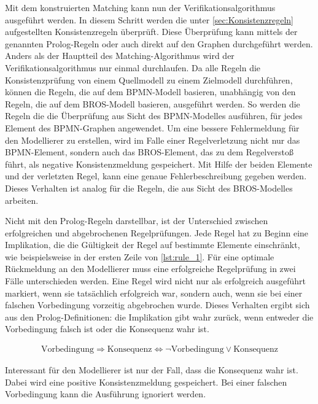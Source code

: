 Mit dem konstruierten Matching kann nun der Verifikationsalgorithmus ausgeführt werden.
In diesem Schritt werden die unter \cref{sec:Konsistenzregeln} aufgestellten Konsistenzregeln überprüft.
Diese Überprüfung kann mittels der genannten Prolog-Regeln oder auch direkt auf den Graphen durchgeführt werden.
Anders als der Hauptteil des Matching-Algorithmus wird der Verifikationsalgorithmus nur einmal durchlaufen.
Da alle Regeln die Konsistenzprüfung von einem Quellmodell zu einem Zielmodell durchführen, können die Regeln, die auf dem BPMN-Modell basieren, unabhängig von den Regeln, die auf dem BROS-Modell basieren, ausgeführt werden.
So werden die Regeln die die Überprüfung aus Sicht des BPMN-Modelles ausführen, für jedes Element des BPMN-Graphen angewendet.
Um eine bessere Fehlermeldung für den Modellierer zu erstellen, wird im Falle einer Regelverletzung nicht nur das BPMN-Element, sondern auch das BROS-Element, das zu dem Regelverstoß führt, als negative Konsistenzmeldung gespeichert.
Mit Hilfe der beiden Elemente und der verletzten Regel, kann eine genaue Fehlerbeschreibung gegeben werden.
Dieses Verhalten ist analog für die Regeln, die aus Sicht des BROS-Modelles arbeiten.

Nicht mit den Prolog-Regeln darstellbar, ist der Unterschied zwischen erfolgreichen und abgebrochenen Regelprüfungen.
Jede Regel hat zu Beginn eine Implikation, die die Gültigkeit der Regel auf bestimmte Elemente einschränkt, wie beispielsweise in der ersten Zeile von \cref{lst:rule_1}.
Für eine optimale Rückmeldung an den Modellierer muss eine erfolgreiche Regelprüfung in zwei Fälle unterschieden werden.
Eine Regel wird nicht nur als erfolgreich ausgeführt markiert, wenn sie tatsächlich erfolgreich war, sondern auch, wenn sie bei einer falschen Vorbedingung vorzeitig abgebrochen wurde.
Dieses Verhalten ergibt sich aus den Prolog-Definitionen: die Implikation gibt wahr zurück, wenn entweder die Vorbedingung falsch ist oder die Konsequenz wahr ist.

\begin{figure}[H]
    \centering
    \begin{align}
        \text{Vorbedingung} \Rightarrow \text{Konsequenz} \Leftrightarrow \neg \text{Vorbedingung} \lor \text{Konsequenz}\nonumber
    \end{align}
\end{figure}

Interessant für den Modellierer ist nur der Fall, dass die Konsequenz wahr ist.
Dabei wird eine positive Konsistenzmeldung gespeichert.
Bei einer falschen Vorbedingung kann die Ausführung ignoriert werden.

